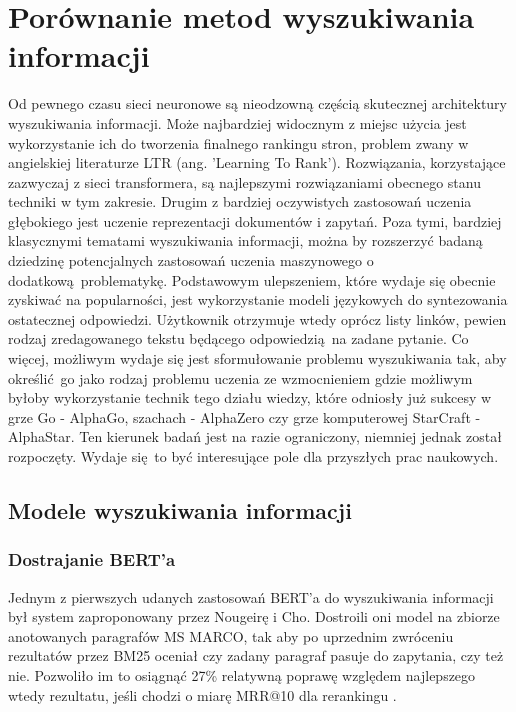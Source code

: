 \chapter{Porównanie metod wyszukiwania informacji}
\label{chap:trzeci}

Od pewnego czasu sieci neuronowe są nieodzowną częścią skutecznej architektury wyszukiwania informacji. Może najbardziej widocznym z miejsc użycia jest wykorzystanie ich do tworzenia finalnego rankingu stron, problem zwany w angielskiej literaturze LTR (ang. 'Learning To Rank'). Rozwiązania, korzystające zazwyczaj z sieci transformera, są najlepszymi rozwiązaniami obecnego stanu techniki w tym zakresie. Drugim z bardziej oczywistych zastosowań uczenia głębokiego jest uczenie reprezentacji dokumentów i zapytań. \autocite{tonellotto2022lecture}  Poza tymi, bardziej klasycznymi tematami wyszukiwania informacji, można by rozszerzyć badaną dziedzinę potencjalnych zastosowań uczenia maszynowego o dodatkową problematykę. Podstawowym ulepszeniem, które wydaje się obecnie zyskiwać na popularności, jest wykorzystanie modeli językowych do syntezowania ostatecznej odpowiedzi. Użytkownik otrzymuje wtedy oprócz listy linków, pewien rodzaj zredagowanego tekstu będącego odpowiedzią na zadane pytanie. Co więcej, możliwym wydaje się jest sformułowanie problemu wyszukiwania tak, aby określić go jako rodzaj problemu uczenia ze wzmocnieniem gdzie możliwym byłoby wykorzystanie technik tego działu wiedzy, które odniosły już sukcesy w grze Go - AlphaGo, szachach - AlphaZero czy grze komputerowej StarCraft - AlphaStar. Ten kierunek badań jest na razie ograniczony, niemniej jednak został rozpoczęty. Wydaje się to być interesujące pole dla przyszłych prac naukowych. 

\section{Modele wyszukiwania informacji}

\subsection{Dostrajanie BERT'a}

Jednym z pierwszych udanych zastosowań BERT'a do wyszukiwania informacji był system zaproponowany przez Nougeirę i Cho. Dostroili oni model na zbiorze anotowanych paragrafów MS MARCO, tak aby po uprzednim zwróceniu rezultatów przez BM25 oceniał czy zadany paragraf pasuje do zapytania, czy też nie. Pozwoliło im to osiągnąć 27\% relatywną poprawę względem najlepszego wtedy rezultatu, jeśli chodzi o miarę MRR@10 dla rerankingu \autocite{nogueira2019passage}.

